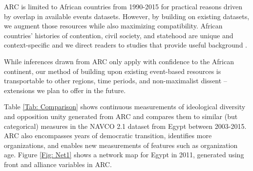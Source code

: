ARC is limited to African countries from 1990-2015 for practical reasons driven by overlap in available events datasets. However, by building on existing datasets, we augment those resources while also maximizing compatibility. African countries' histories of contention, civil society, and statehood are unique and context-specific and we direct readers to studies that provide useful background \citep{Boone2003, Branch2015, Bratton1997, Herbst2014, Mueller2018}. 

While inferences drawn from ARC only apply with confidence to the African continent, our method of building upon existing event-based resources is transportable to other regions, time periods, and non-maximalist dissent -- extensions we plan to offer in the future.  


Table \ref{Tab: Comparison} shows continuous measurements of ideological diversity and opposition unity generated from ARC and compares them to similar (but categorical) measures in the NAVCO 2.1 dataset \citep{Chenoweth2019a} from Egypt between 2003-2015. ARC also encompasses years of democratic transition, identifies more organizations, and enables new measurements of features such as organization age. Figure \ref{Fig: Net1} shows a network map for Egypt in 2011, generated using front and alliance variables in ARC.  

\clearpage

\singlespacing

